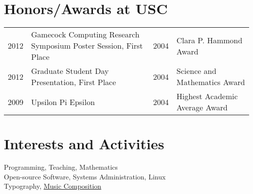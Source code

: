\documentclass[10pt]{article}
\begin{document}
\section{Honors/Awards at USC}
\begin{tabular}{r|p{8cm} l|p{5cm}}
2012 & \footnotesize{Gamecock Computing Research Symposium Poster Session,  First Place} &
2004 & Clara P. Hammond Award  \\

2012 & Graduate Student Day Presentation,  First Place &
2004 & Science and Mathematics Award \\

2009 & Upsilon Pi Epsilon &
2004 & Highest Academic Average Award \\
\end{tabular}

\section{Interests and Activities}
Programming, Teaching, Mathematics\\
Open-source Software, Systems Administration, Linux\\
Typography, \href{https://soundcloud.com/malloc47}{Music Composition}

\pagestyle{myheadings}

\end{document}
